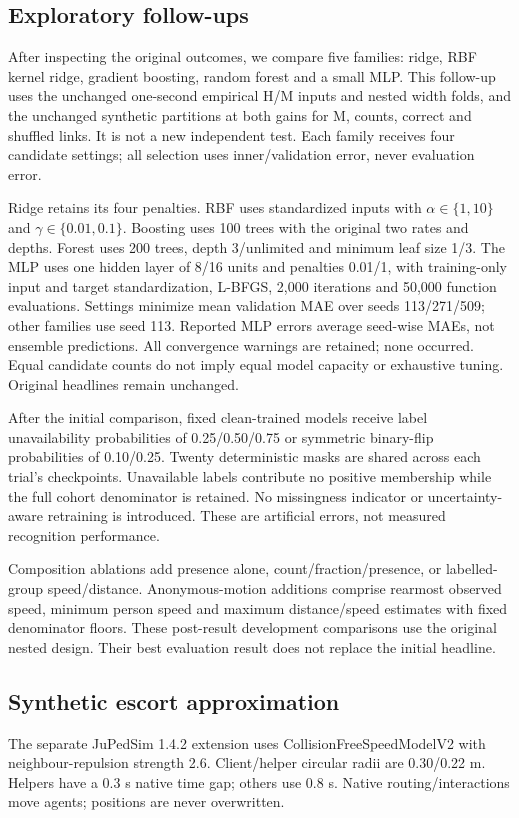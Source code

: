 \documentclass[conference]{IEEEtran}
\begin{document}
\subsection{Exploratory follow-ups}
After inspecting the original outcomes, we compare five families: ridge, RBF kernel ridge, gradient boosting, random forest and a small MLP. This follow-up uses the unchanged one-second empirical H/M inputs and nested width folds, and the unchanged synthetic partitions at both gains for M, counts, correct and shuffled links. It is not a new independent test. Each family receives four candidate settings; all selection uses inner/validation error, never evaluation error.

Ridge retains its four penalties. RBF uses standardized inputs with $\alpha\in\{1,10\}$ and $\gamma\in\{0.01,0.1\}$. Boosting uses 100 trees with the original two rates and depths. Forest uses 200 trees, depth 3/unlimited and minimum leaf size 1/3. The MLP uses one hidden layer of 8/16 units and penalties 0.01/1, with training-only input and target standardization, L-BFGS, 2,000 iterations and 50,000 function evaluations. Settings minimize mean validation MAE over seeds 113/271/509; other families use seed 113. Reported MLP errors average seed-wise MAEs, not ensemble predictions. All convergence warnings are retained; none occurred. Equal candidate counts do not imply equal model capacity or exhaustive tuning. Original headlines remain unchanged.

After the initial comparison, fixed clean-trained models receive label unavailability probabilities of 0.25/0.50/0.75 or symmetric binary-flip probabilities of 0.10/0.25. Twenty deterministic masks are shared across each trial's checkpoints. Unavailable labels contribute no positive membership while the full cohort denominator is retained. No missingness indicator or uncertainty-aware retraining is introduced. These are artificial errors, not measured recognition performance.

Composition ablations add presence alone, count/fraction/presence, or labelled-group speed/distance. Anonymous-motion additions comprise rearmost observed speed, minimum person speed and maximum distance/speed estimates with fixed denominator floors. These post-result development comparisons use the original nested design. Their best evaluation result does not replace the initial headline.

\subsection{Synthetic escort approximation}
The separate JuPedSim 1.4.2 extension uses CollisionFreeSpeedModelV2 with neighbour-repulsion strength 2.6. Client/helper circular radii are 0.30/0.22 m. Helpers have a 0.3 s native time gap; others use 0.8 s. Native routing/interactions move agents; positions are never overwritten.
\end{document}
